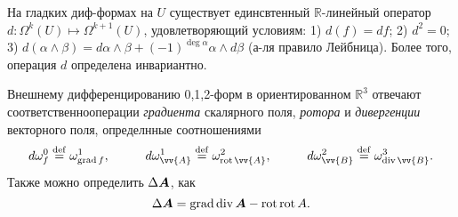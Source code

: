 \begin{to_lem} 
    На гладких диф-формах на $U$ существует единсвтенный $\mathbb{R}$-линейный оператор $d \colon \Omega^k (U) \mapsto \Omega^{k+1} (U)$, удовлетворяющий условиям: 
    1) $d(f) = df$;
    2) $d^2 = 0$;
    3) $d(\alpha \wedge \beta) = d \alpha \wedge \beta + (-1)^{\deg \alpha} \alpha \wedge d \beta$ (а-ля правило Лейбница).
    Более того, операция $d$ определена инвариантно.
\end{to_lem}


\begin{to_def} 
    Внешнему дифференцированию 0,1,2-форм в ориентированном $\mathbb{R}^3$ отвечают соответственнооперации \textit{градиента} скалярного поля, \textit{ротора} и \textit{дивергенции} векторного поля, определнные соотношениями
\begin{equation*}
     d \omega^0_f \overset{\mathrm{def}}{=} \omega^1_{\grad f}, \hspace{1cm} 
     d \omega^1_{\vv{A}} \overset{\mathrm{def}}{=} \omega^2_{\rot \vv{A}}, \hspace{1cm} 
     d \omega^2_{\vv{B}} \overset{\mathrm{def}}{=} \omega^3_{\div \vv{B}}.
 \end{equation*} 
    Также можно определить $\Delta \mbox{\boldmath $A$}$, как
\begin{equation*}
    \Delta \mbox{\boldmath $A$} = \mathop{\mathrm{grad}}\nolimits \mathop{\mathrm{div}}\nolimits \mbox{\boldmath $A$} - \mathop{\mathrm{rot}}\nolimits \mathop{\mathrm{rot}}\nolimits A.
\end{equation*}
\end{to_def}





